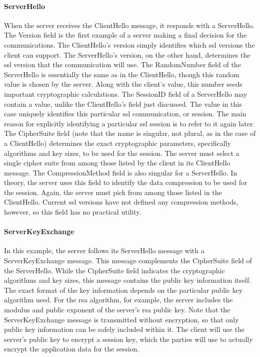 \paragraph{ServerHello}
When the server receives the ClientHello message, it responds with a
ServerHello. 
The Version field is the first example of a server making a final 
decision for the communications. The ClientHello’s version simply identifies 
which ssl versions the client can support. The ServerHello’s
version, on the other hand, determines the ssl version that the communication
 will use. 
The RandomNumber field of the ServerHello is essentially the same
as in the ClientHello, though this random value is chosen by the
server. Along with the client’s value, this number seeds important
cryptographic calculations. 
The SessionID field of a ServerHello may contain a value, unlike the
ClientHello’s field just discussed. The value in this case uniquely
identifies this particular ssl communication, or session. The main reason for 
explicitly identifying a particular ssl session is to refer to it
again later.
The CipherSuite field (note that the name is singular, not plural, as in
the case of a ClientHello) determines the exact cryptographic parameters, 
specifically algorithms and key sizes, to be used for the session. 
The server must select a single cipher suite from among those
listed by the client in its ClientHello message.
The CompressionMethod field is also singular for a ServerHello. In
theory, the server uses this field to identify the data compression to
be used for the session. Again, the server must pick from among
those listed in the ClientHello. Current ssl versions have not defined
any compression methods, however, so this field has no practical utility.

\paragraph{ServerKeyExchange}
In this example, the server follows its ServerHello message with a
ServerKeyExchange message. This message complements the CipherSuite field 
of the ServerHello. While the CipherSuite field indicates
the cryptographic algorithms and key sizes, this message contains the
public key information itself. The exact format of the key information depends
 on the particular public key algorithm used. For the rsa
algorithm, for example, the server includes the modulus and public
exponent of the server’s rsa public key.
Note that the ServerKeyExchange message is transmitted without
encryption, so that only public key information can be safely included within it.
 The client will use the server’s public key to encrypt
a session key, which the parties will use to actually encrypt the application
 data for the session.
